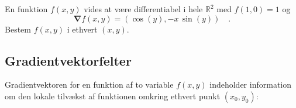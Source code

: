 \begin{exercise}
En funktion $f(x,y)$ vides at være differentiabel i hele $\mathbb{R}^{2}$ med $f(1,0) = 1$ og
\begin{equation}
{\bm{\nabla}}f(x,y) = (\cos(y), -x\,\sin(y)) \quad .
\end{equation}
Bestem $f(x,y)$ i ethvert $(x,y)$.
\end{exercise}

\subsection{Gradientvektorfelter} \label{subsecGradVecFelt}
Gradientvektoren for en funktion af to variable  $f(x,y)$ indeholder information om den lokale tilvækst af funktionen omkring ethvert punkt $(x_{0}, y_{0})$:


